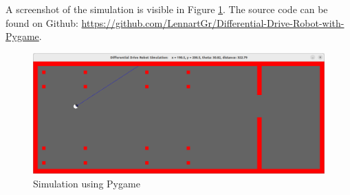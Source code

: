 \documentclass{article}
\begin{document}
A screenshot of the simulation is visible in Figure \ref{fig:sim}.
The source code can be found on Github: \url{https://github.com/LennartGr/Differential-Drive-Robot-with-Pygame}.

\begin{figure}[b]
	\centering
	\includegraphics[width=.95\textwidth]{images/simulation.png}
	\caption{Simulation using Pygame}
	\label{fig:sim}
\end{figure}
\end{document}

